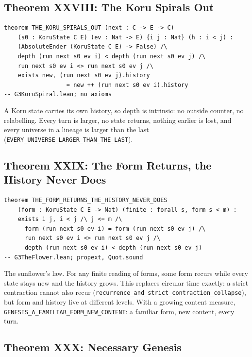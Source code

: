 \documentclass[12pt,a4paper]{article}
\begin{document}
\subsection{Theorem XXVIII: The Koru Spirals Out}

\begin{lstlisting}
theorem THE_KORU_SPIRALS_OUT (next : C -> E -> C)
    (s0 : KoruState C E) (ev : Nat -> E) {i j : Nat} (h : i < j) :
    (AbsoluteEnder (KoruState C E) -> False) /\
    depth (run next s0 ev i) < depth (run next s0 ev j) /\
    run next s0 ev i <> run next s0 ev j /\
    exists new, (run next s0 ev j).history
                  = new ++ (run next s0 ev i).history
-- G3KoruSpiral.lean; no axioms
\end{lstlisting}

A Koru state carries its own history, so depth is intrinsic: no outside
counter, no relabelling. Every turn is larger, no state returns, nothing
earlier is lost, and every universe in a lineage is larger than the last
(\texttt{EVERY\_UNIVERSE\_LARGER\_THAN\_THE\_LAST}).

\subsection{Theorem XXIX: The Form Returns, the History Never Does}

\begin{lstlisting}
theorem THE_FORM_RETURNS_THE_HISTORY_NEVER_DOES
    (form : KoruState C E -> Nat) (finite : forall s, form s < m) :
    exists i j, i < j /\ j <= m /\
      form (run next s0 ev i) = form (run next s0 ev j) /\
      run next s0 ev i <> run next s0 ev j /\
      depth (run next s0 ev i) < depth (run next s0 ev j)
-- G3TheFlower.lean; propext, Quot.sound
\end{lstlisting}

The sunflower's law. For any finite reading of forms, some form recurs
while every state stays new and the history grows. This replaces circular
time exactly: a strict contraction cannot also recur
(\texttt{recurrence\_and\_strict\_contraction\_collapse}), but form and
history live at different levels. With a growing content measure,
\texttt{GENESIS\_A\_FAMILIAR\_FORM\_NEW\_CONTENT}: a familiar form, new
content, every turn.

\subsection{Theorem XXX: Necessary Genesis}
\end{document}
